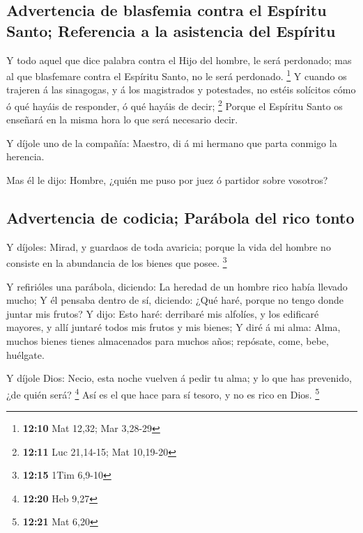 \hypertarget{advertencia-de-blasfemia-contra-el-espuxedritu-santo-referencia-a-la-asistencia-del-espuxedritu}{%
\subsection{Advertencia de blasfemia contra el Espíritu Santo;
Referencia a la asistencia del
Espíritu}\label{advertencia-de-blasfemia-contra-el-espuxedritu-santo-referencia-a-la-asistencia-del-espuxedritu}}

 Y todo aquel que dice palabra contra el Hijo del hombre,
le será perdonado; mas al que blasfemare contra el Espíritu Santo, no le
será perdonado. \footnote{\textbf{12:10} Mat 12,32; Mar 3,28-29}
 Y cuando os trajeren á las sinagogas, y á los magistrados
y potestades, no estéis solícitos cómo ó qué hayáis de responder, ó qué
hayáis de decir; \footnote{\textbf{12:11} Luc 21,14-15; Mat 10,19-20}
 Porque el Espíritu Santo os enseñará en la misma hora lo
que será necesario decir.

 Y díjole uno de la compañía: Maestro, di á mi hermano que
parta conmigo la herencia.

 Mas él le dijo: Hombre, ¿quién me puso por juez ó partidor
sobre vosotros?

\hypertarget{advertencia-de-codicia-paruxe1bola-del-rico-tonto}{%
\subsection{Advertencia de codicia; Parábola del rico
tonto}\label{advertencia-de-codicia-paruxe1bola-del-rico-tonto}}

 Y díjoles: Mirad, y guardaos de toda avaricia; porque la
vida del hombre no consiste en la abundancia de los bienes que posee.
\footnote{\textbf{12:15} 1Tim 6,9-10}

 Y refirióles una parábola, diciendo: La heredad de un
hombre rico había llevado mucho;  Y él pensaba dentro de
sí, diciendo: ¿Qué haré, porque no tengo donde juntar mis frutos?
 Y dijo: Esto haré: derribaré mis alfolíes, y los edificaré
mayores, y allí juntaré todos mis frutos y mis bienes;  Y
diré á mi alma: Alma, muchos bienes tienes almacenados para muchos años;
repósate, come, bebe, huélgate.

 Y díjole Dios: Necio, esta noche vuelven á pedir tu alma;
y lo que has prevenido, ¿de quién será? \footnote{\textbf{12:20} Heb
  9,27}  Así es el que hace para sí tesoro, y no es rico en
Dios. \footnote{\textbf{12:21} Mat 6,20}

